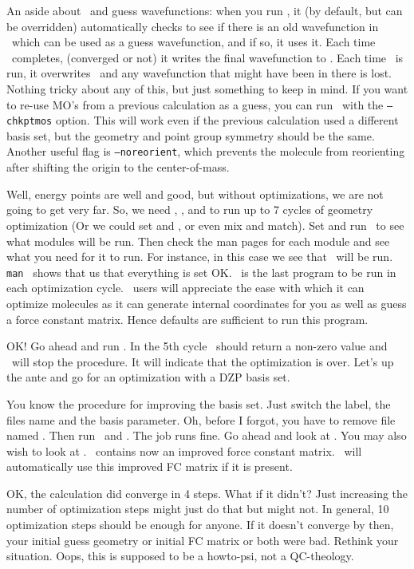 An aside about \PSIcscf\ and guess wavefunctions: when you run \PSIcscf,
it (by default, but can be overridden) automatically checks
to see if there is an old wavefunction in \ which can be used
as a guess wavefunction, and if so, it uses it.
Each time \PSIcscf\ completes, (converged or not) it writes
the final wavefunction to . Each time \PSIinput\ is run, it overwrites
\ and any wavefunction that might have been in there is
lost. Nothing tricky about any of this, but just something to
keep in mind.  If you want to re-use MO's from a previous calculation as a
guess, you can run \PSIinput\ with the {\tt --chkptmos} option.  This will
work even if the previous calculation used a different basis set, but the
geometry and point group symmetry should be the same.  Another useful
flag is {\tt --noreorient}, which prevents the molecule from reorienting
after shifting the origin to the center-of-mass.

Well, energy points are well and good, but without optimizations,
we are not going to get very far. So, we need ,
, and  to run up to 7 cycles of geometry
optimization (Or we could set 
and , or even mix and match). Set 
and run \PSIdriver\ to see what modules will be run. Then check the man
pages for each module and see what you need for it to run. For instance,
in this case we see that \PSIcderiv\ will be run. {\tt man \PSIcints}
shows that us that everything is set OK. \PSIoptking\ is the
last program to be run in each optimization cycle. \PSItwo\
users will appreciate the ease with which it can optimize molecules
as it can generate internal coordinates for you as well as guess a
force constant matrix. Hence defaults are sufficient to run this program.

OK! Go ahead and run \PSIdriver. In the 5th cycle \PSIoptking\ 
should return a non-zero value and \PSIdriver\ will stop the
procedure. It will indicate that the optimization is
over. Let's up the ante and go for an optimization with a DZP basis set.

You know the procedure for improving the basis set.
Just switch the label, the files name and the basis parameter.
Oh, before I forgot, you have to remove file named \optaux. Then run \PSIinput\ 
and \PSIdriver. The job runs fine. Go ahead and look at \outputdat.
You may also wish to look at \FILE{11.dat}. \fconstdat\ contains now
an improved force constant matrix. \PSIoptking\ will automatically
use this improved FC matrix if it is present.

OK, the calculation did converge in 4 steps. What if it didn't?
Just increasing the number of optimization steps might just
do that but might not. In general, 10 optimization steps should be enough
for anyone. If it doesn't converge by then,
your initial guess geometry or initial FC matrix
or both were bad. Rethink your situation.
Oops, this is supposed to be a howto-psi, not a QC-theology. 
